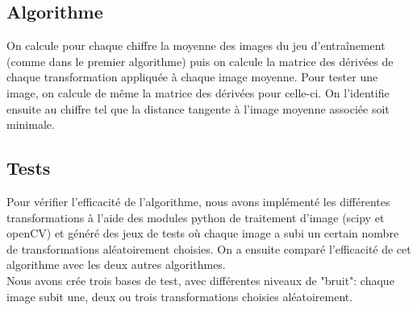 \documentclass[a4paper,11pt,twoside]{report}
\begin{document}
\subsection{Algorithme}
On calcule pour chaque chiffre la moyenne des images du jeu d'entraînement (comme dans le premier algorithme) puis on calcule la matrice des dérivées de chaque transformation appliquée à chaque image moyenne. Pour tester une image, on calcule de même la matrice des dérivées pour celle-ci. On l'identifie ensuite au chiffre tel que la distance tangente à l'image moyenne associée soit minimale.



\subsection{Tests}
Pour vérifier l'efficacité de l'algorithme, nous avons implémenté les différentes transformations à l'aide des modules python de traitement d'image (scipy et openCV) et généré des jeux de tests où chaque image a subi un certain nombre de transformations aléatoirement choisies. On a ensuite comparé l'efficacité de cet algorithme avec les deux autres algorithmes.\\
Nous avons crée trois bases de test, avec différentes niveaux de "bruit": chaque image subit une, deux ou trois transformations choisies aléatoirement.
\end{document}
